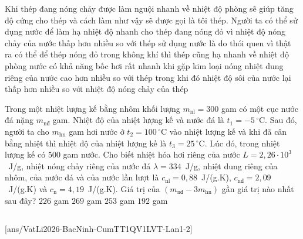 	\begin{ex}%
		Khi thép đang nóng chảy được làm nguội nhanh về nhiệt độ phòng sẽ giúp tăng độ cứng cho thép và cách làm như vậy sẽ được gọi là tôi thép. Người ta có thể sử dụng nước để làm hạ nhiệt độ nhanh cho thép đang nóng đỏ vì
		\choice
		{nhiệt độ nóng chảy của nước thấp hơn nhiều so với thép}
		{sử dụng nước là do thói quen vì thật ra có thể để thép nóng đỏ trong không khí thì thép cũng hạ nhanh về nhiệt độ phòng}
		{nước có khả năng bốc hơi rất nhanh khi gặp kim loại nóng}
		{\True nhiệt dung riêng của nước cao hơn nhiều so với thép trong khi đó nhiệt độ sôi của nước lại thấp hơn nhiều so với nhiệt độ nóng chảy của thép}
	\end{ex}

	\begin{ex}%
		Trong một nhiệt lượng kế bằng nhôm khối lượng $m_{\text{nl}}=300$ gam có một cục nước đá nặng $m_{\text{nđ}}$ gam. Nhiệt độ của nhiệt lượng kế và nước đá là $t_1=-5\,^\circ\text{C}$. Sau đó, người ta cho $m_{\text{hn}}$ gam hơi nước ở $t_2=100\,^\circ\text{C}$ vào nhiệt lượng kế và khi đã cân bằng nhiệt thì nhiệt độ của nhiệt lượng kế là $t_3=25\,^\circ\text{C}$. Lúc đó, trong nhiệt lượng kế có $500$ gam nước. Cho biết nhiệt hóa hơi riêng của nước $L=2{,}26\cdot 10^3$~J/g, nhiệt nóng chảy riêng của nước đá $\lambda=334$~J/g, nhiệt dung riêng của nhôm, của nước đá và của nước lần lượt là $c_{\text{nl}}=0{,}88$~J/(g.K), $c_{\text{nđ}}=2{,}09$~J/(g.K) và $c_\text{n}=4{,}19$~J/(g.K). Giá trị của $(m_{\text{nđ}}-3m_{\text{hn}})$ gần giá trị nào nhất sau đây?
		\choice
		{$226$ gam}
		{$269$ gam}
		{$253$ gam}
		{\True $192$ gam}
	\end{ex}

	\subsection*{}
	\setcounter{ex}{0}
	[ans/VatLi2026-BacNinh-CumTT1QV1LVT-Lan1-2]

